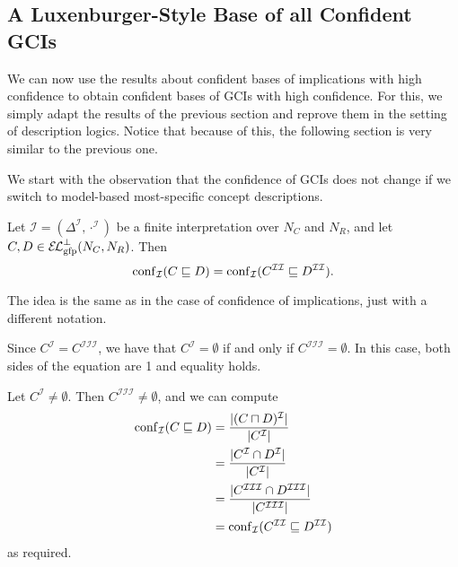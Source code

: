 \subsection{A Luxenburger-Style Base of all Confident GCIs}
\label{sec:first-base}

We can now use the results about confident bases of implications with high confidence to
obtain confident bases of GCIs with high confidence.  For this, we simply adapt the
results of the previous section and reprove them in the setting of description logics.
Notice that because of this, the following section is very similar to the previous one.

We start with the observation that the confidence of GCIs does not change if we switch to
model-based most-specific concept descriptions.

\begin{Lemma}
  \label{lem:confidence-stays-under-mmsc}
  Let $\mathcal{I} = (\Delta^{\mathcal{I}}, \cdot^{\mathcal{I}})$ be a finite
  interpretation over $N_C$ and $N_R$, and let $C, D \in {\ensuremath{{\mathcal{E}\kern-.3ex\mathcal{L}}_\text{gfp}^\bot}}(N_C, N_R)$.  Then
  \begin{equation*}
    \operatorname{conf}_{\mathcal{I}}( C \sqsubseteq D ) = \operatorname{conf}_{\mathcal{I}}(
    C^{\mathcal{I}\mathcal{I}} \sqsubseteq D^{\mathcal{I}\mathcal{I}}).
  \end{equation*}
\end{Lemma}
\begin{Proof}
  The idea is the same as in the case of confidence of implications, just with a different
  notation.

  Since $C^{\mathcal{I}} = C^{\mathcal{I}\mathcal{I}\mathcal{I}}$, we have that
  $C^{\mathcal{I}} = \emptyset$ if and only if $C^{\mathcal{I}\mathcal{I}\mathcal{I}} =
  \emptyset$.  In this case, both sides of the equation are 1 and equality holds.

  Let $C^{\mathcal{I}} \neq \emptyset$.  Then $C^{\mathcal{I}\mathcal{I}\mathcal{I}} \neq
  \emptyset$, and we can compute
  \begin{align*}
    \operatorname{conf}_{\mathcal{I}}( C \sqsubseteq D )
    &= \frac{ \lvert (C \sqcap D)^{\mathcal{I}} \rvert }{ \lvert C^{\mathcal{I}} \rvert } \\
    &= \frac{ \lvert C^{\mathcal{I}} \cap D^{\mathcal{I}} \rvert }{ \lvert C^{\mathcal{I}} \rvert }
    \\
    &= \frac{ \lvert C^{\mathcal{I}\mathcal{I}\mathcal{I}} \cap
        D^{\mathcal{I}\mathcal{I}\mathcal{I}} \rvert }{ \lvert
        C^{\mathcal{I}\mathcal{I}\mathcal{I}} \rvert } \\
    &= \operatorname{conf}_{\mathcal{I}}( C^{\mathcal{I}\mathcal{I}} \sqsubseteq
    D^{\mathcal{I}\mathcal{I}} )
  \end{align*}
  as required.
\end{Proof}

